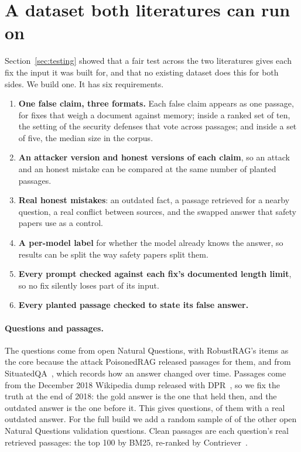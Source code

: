 \section{A dataset both literatures can run on}
\label{sec:dataset}

Section~\ref{sec:testing} showed that a fair test across the two literatures
gives each fix the input it was built for, and that no existing dataset does
this for both sides. We build one. It has six requirements.

\begin{enumerate}
\item \textbf{One false claim, three formats.} Each false claim appears as
  one passage, for fixes that weigh a document against memory; inside a
  ranked set of ten, the setting of the security defenses that vote across
  passages; and inside a set of five, the median size in the corpus.
\item \textbf{An attacker version and honest versions of each claim}, so an
  attack and an honest mistake can be compared at the same number of planted
  passages.
\item \textbf{Real honest mistakes}: an outdated fact, a passage retrieved for
  a nearby question, a real conflict between sources, and the swapped answer
  that safety papers use as a control.
\item \textbf{A per-model label} for whether the model already knows the
  answer, so results can be split the way safety papers split them.
\item \textbf{Every prompt checked against each fix's documented length
  limit}, so no fix silently loses part of its input.
\item \textbf{Every planted passage checked to state its false answer.}
\end{enumerate}

\paragraph{Questions and passages.} The questions come from open Natural
Questions, with RobustRAG's \NSdCore{} items as the core because the attack
PoisonedRAG released passages for them, and from SituatedQA~\cite{zhang-2021-situatedqa},
which records how an answer changed over time. Passages come from the
December 2018 Wikipedia dump released with DPR~\cite{karpukhin-2020-dense}, so we fix the truth at the
end of 2018: the gold answer is the one that held then, and the outdated
answer is the one before it. This gives \NSdQuestions{} questions,
\NSdOutdated{} of them with a real outdated answer. For the full build we add
a random sample of \NSdNqvSample{} of the other \NSdNqvPool{} open Natural
Questions validation questions. Clean passages are each
question's real retrieved passages: the top 100 by BM25, re-ranked by
Contriever~\cite{izacard-2022-unsupervised}.

